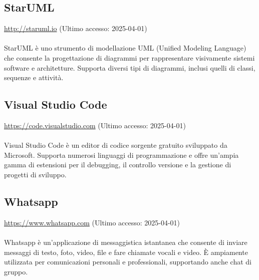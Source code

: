 \subsection{StarUML}
\label{StarUML}
\href{http://staruml.io}{http://staruml.io} (Ultimo accesso: 2025-04-01) \\ \\  
StarUML è uno strumento di modellazione UML (Unified Modeling Language) che consente la progettazione di diagrammi per rappresentare visivamente sistemi software e architetture. Supporta diversi tipi di diagrammi, inclusi quelli di classi, sequenze e attività.

\subsection{Visual Studio Code}
\label{Visual Studio Code}
\href{https://code.visualstudio.com}{https://code.visualstudio.com} (Ultimo accesso: 2025-04-01) \\ \\  
Visual Studio Code è un editor di codice sorgente gratuito sviluppato da Microsoft. Supporta numerosi linguaggi di programmazione e offre un'ampia gamma di estensioni per il debugging, il controllo versione e la gestione di progetti di sviluppo.

\subsection{Whatsapp}
\label{Whatsapp}
\href{https://www.whatsapp.com}{https://www.whatsapp.com} (Ultimo accesso: 2025-04-01) \\ \\  
Whatsapp è un'applicazione di messaggistica istantanea che consente di inviare messaggi di testo, foto, video, file e fare chiamate vocali e video. È ampiamente utilizzata per comunicazioni personali e professionali, supportando anche chat di gruppo.

